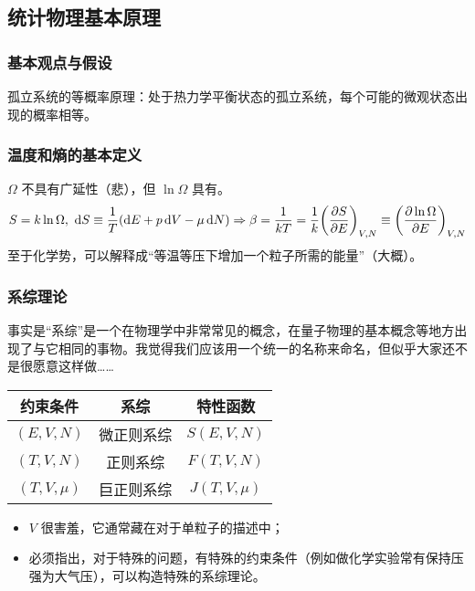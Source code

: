 \subsection{统计物理基本原理}

\subsubsection{基本观点与假设}

孤立系统的等概率原理：处于热力学平衡状态的孤立系统，每个可能的微观状态出现的概率相等。

\subsubsection{温度和熵的基本定义}

$\Omega$ 不具有广延性（悲），但 $\ln{\Omega}$ 具有。
\[
    S = k \ln{\Omega},\ \dd{S} \equiv \frac{1}{T} \qty(\dd{E} + p \dd{V} - \mu \dd{N}) \Rightarrow \beta = \frac{1}{k T} = \frac{1}{k} \qty(\pdv{S}{E})_{V, N} \equiv \qty(\pdv{\ln{\Omega}}{E})_{V, N}
\]
至于化学势，可以解释成“等温等压下增加一个粒子所需的能量”（大概）。

\subsubsection{系综理论}

事实是“系综”是一个在物理学中非常常见的概念，在量子物理的基本概念等地方出现了与它相同的事物。我觉得我们应该用一个统一的名称来命名，但似乎大家还不是很愿意这样做……

\begin{table}[H]
    \centering
    \begin{tabular}{|c|c|c|}
        \hline
        约束条件          & 系综    & 特性函数           \\
        \hline
        $(E, V, N)$   & 微正则系综 & $S(E, V, N)$   \\
        \hline
        $(T, V, N)$   & 正则系综  & $F(T, V, N)$   \\
        \hline
        $(T, V, \mu)$ & 巨正则系综 & $J(T, V, \mu)$ \\
        \hline
    \end{tabular}
\end{table}

\begin{itemize}
    \item $V$ 很害羞，它通常藏在对于单粒子的描述中；
    \item 必须指出，对于特殊的问题，有特殊的约束条件（例如做化学实验常有保持压强为大气压），可以构造特殊的系综理论。
\end{itemize}

